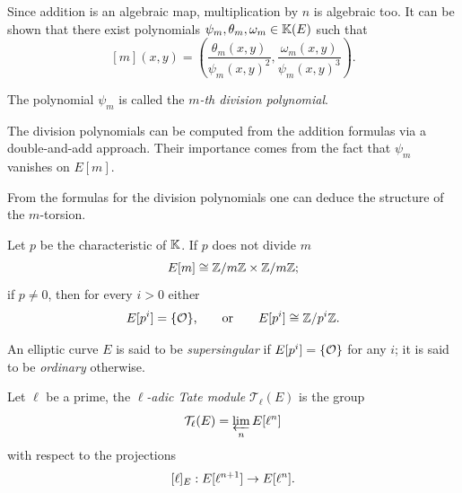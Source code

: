 Since addition is an algebraic map, multiplication by $n$ is algebraic
too. It can be shown that there exist polynomials
$\psi_m,\theta_m,\omega_m\in\mathbb{K}(E)$ such that
\begin{equation}
  \label{eq:124}
  [m](x,y) = \left(\frac{\theta_m(x,y)}{\psi_m(x,y)^2},
    \frac{\omega_m(x,y)}{\psi_m(x,y)^3}\right)
  \text{.}
\end{equation}

\begin{definition}
  The polynomial $\psi_m$ is called the
  \emph{$m$-th division polynomial}.
\end{definition}

\begin{remark}
  The division polynomials can be computed from the addition formulas
  via a double-and-add approach. Their importance comes from the fact
  that $\psi_m$ vanishes on $E[m]$.
\end{remark}

From the formulas for the division polynomials one can deduce the
structure of the $m$-torsion.

\begin{theorem}
  Let $p$ be the characteristic of $\mathbb{K}$. If $p$ does not divide $m$
  \begin{equation}
    \label{eq:126}
    E[m] \cong \mathbb{Z}/m\mathbb{Z}\times\mathbb{Z}/m\mathbb{Z}
    \text{;}
  \end{equation}
  if $p\ne0$, then for every $i>0$ either
  \begin{equation}
    \label{eq:127}
    E[p^i] = \{\mathcal{O}\}\text{,} 
    \qquad\text{or}\qquad E[p^i] \cong \mathbb{Z}/p^i\mathbb{Z}
    \text{.}
  \end{equation}
\end{theorem}

\begin{definition}
  An elliptic curve $E$ is said to be
  \emph{supersingular}
  if $E[p^i]=\{\mathcal{O}\}$ for any $i$; it is said to be
  \emph{ordinary} otherwise.
\end{definition}

\begin{definition}
  Let $\ell$ be a prime, the \emph{$\ell$-adic Tate
    module}
  $\mathcal{T}_\ell(E)$ is the group
  \begin{equation}
    \label{eq:132}
    \mathcal{T}_\ell(E) = \varprojlim_n E[\ell^n]
  \end{equation}
  with respect to the projections
  \begin{equation}
    \label{eq:133}
    [\ell]_E : E[\ell^{n+1}] \rightarrow E[\ell^{n}]
    \text{.}
  \end{equation}
\end{definition}

